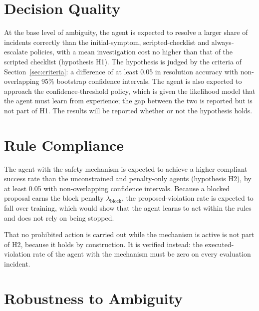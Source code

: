 \section{Decision Quality}

At the base level of ambiguity, the agent is expected to resolve a larger share of incidents correctly than the initial-symptom, scripted-checklist and always-escalate policies, with a mean investigation cost no higher than that of the scripted checklist (hypothesis H1). The hypothesis is judged by the criteria of Section~\ref{sec:criteria}: a difference of at least 0.05 in resolution accuracy with non-overlapping 95\% bootstrap confidence intervals. The agent is also expected to approach the confidence-threshold policy, which is given the likelihood model that the agent must learn from experience; the gap between the two is reported but is not part of H1. The results will be reported whether or not the hypothesis holds.

\section{Rule Compliance}

The agent with the safety mechanism is expected to achieve a higher compliant success rate than the unconstrained and penalty-only agents (hypothesis H2), by at least 0.05 with non-overlapping confidence intervals. Because a blocked proposal earns the block penalty $\lambda_{\text{block}}$, the proposed-violation rate is expected to fall over training, which would show that the agent learns to act within the rules and does not rely on being stopped.

That no prohibited action is carried out while the mechanism is active is not part of H2, because it holds by construction. It is verified instead: the executed-violation rate of the agent with the mechanism must be zero on every evaluation incident.

\section{Robustness to Ambiguity}

